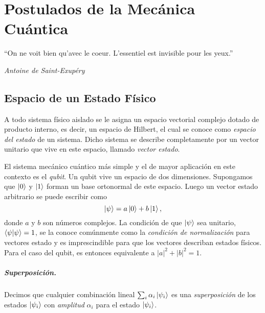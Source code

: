 \chapter{Postulados de la Mecánica Cuántica\label{ch:postulados}}

\begin{center}
  \begin{minipage}{0.5\textwidth}
    \begin{small}
      ``On ne voit bien qu’avec le coeur. L’essentiel est invisible pour les yeux.'' \par
 \begin{flushright}{\it Antoine de Saint-Exupéry}
 \end{flushright}
    \end{small}
\end{minipage}
  \vspace{0.5cm}
\end{center}

\section{Espacio de un Estado Físico}

\begin{postulate}
  A todo sistema físico aislado se le asigna un espacio vectorial complejo dotado de producto interno, es decir, un espacio de Hilbert, el cual se conoce como \emph{espacio del estado} de un sistema. Dicho sistema se describe completamente por un vector unitario que vive en este espacio, llamado \emph{vector estado}.
\end{postulate}

El sistema mecánico cuántico más simple y el de mayor aplicación en este contexto es el \emph{qubit}. Un qubit 
vive un espacio de dos dimensiones.
Supongamos que  $\ket{0}$ y $\ket{1}$ forman un base ortonormal de este espacio.
Luego un vector estado arbitrario se puede escribir como
\begin{equation*}
  \ket{\psi} = a\ket{0} + b\ket{1},
\end{equation*} donde $a$ y $b$ son números complejos. 
La condición de que $\ket{\psi}$ sea unitario, $\braket{\psi}{\psi} = 1$, se la conoce comúnmente como la \emph{condición de normalización} para vectores estado y es imprescindible para que los vectores describan estados físicos. Para el caso del qubit, es entonces equivalente a $|a|^2 + |b|^2 = 1$. 


\paragraph{Superposición.} Decimos que cualquier combinación lineal $\sum_i \alpha_i
\ket{\psi_i}$ es una \emph{superposición} de los estados $\ket{\psi_i}$ con
\emph{amplitud} $\alpha_i$ para el estado $\ket{\psi_i}$.

